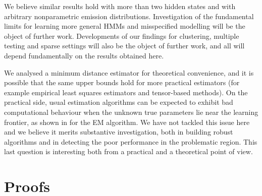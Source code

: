 \documentclass[journal]{IEEEtran}
\newcommand{\1}{\boldsymbol{1}}
\begin{document}
We believe similar results hold with more than two hidden states and with arbitrary nonparametric emission distributions. Investigation of the fundamental limits for learning more general HMMs and misspecified modelling will be the object of further work. Developments of our findings for clustering, multiple testing and sparse settings will also be the object of further work, and all will depend fundamentally on the results obtained here.


We analysed a minimum distance estimator for theoretical convenience, and it is possible that the same upper bounds hold for more practical estimators (for example empirical least squares estimators and tensor-based methods).	On the practical side, usual estimation algorithms can be expected to exhibit bad computational behaviour when the unknown true parameters lie near the learning frontier, as shown in \cite{Phys:2020} for  the EM algorithm.
	We have not tackled this issue here and we believe it merits substantive investigation, both in building robust algorithms and in detecting the poor performance in the problematic region. This last question is interesting both from a practical and a theoretical point of view.






\section{Proofs}
\label{sec:proofs}
\end{document}
